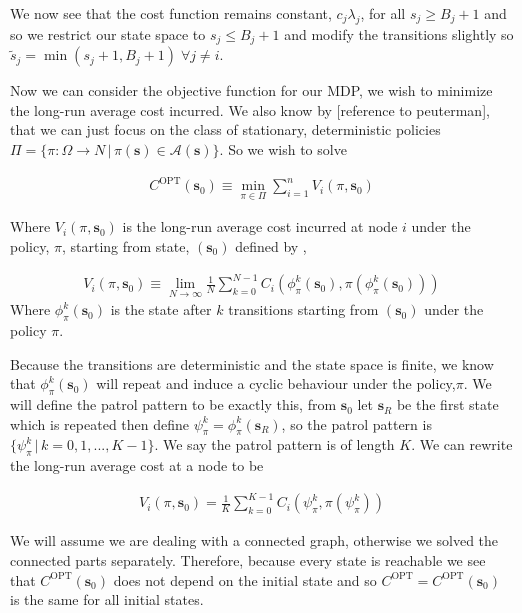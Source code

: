 \documentclass[a4paper,10pt]{article}
\theoremstyle{definition}
\theoremstyle{definition}
\theoremstyle{remark}
\theoremstyle{definition}
\begin{document}
We now see that the cost function remains constant, $c_{j} \lambda_{j}$, for all $s_{j} \geq B_{j}+1$ and so we restrict our state space to $s_{j} \leq B_{j}+1$ and modify the transitions slightly so $\widetilde{s}_{j}=\min(s_{j}+1,B_{j}+1) \; \forall j \neq i$.

Now we can consider the objective function for our MDP, we wish to minimize the long-run average cost incurred. We also know by [reference to peuterman], that we can just focus on the class of stationary, deterministic policies $\Pi= \{\pi: \Omega \rightarrow N \, |\,\pi(\bm{s}) \in \mathcal{A}(\bm{s}) \}$. So we wish to solve

\begin{align*}
C^{\text{OPT}}(\bm{s}_{0}) \equiv \min\limits_{\pi \in \Pi} \sum\limits_{i=1}^{n} V_{i}(\pi,\bm{s}_{0})
\end{align*}

Where $V_{i}(\pi,\bm{s}_{0})$ is the long-run average cost incurred at node $i$ under the policy, $\pi$, starting from state, $(\bm{s}_{0})$ defined by ,

\begin{align*}
V_{i}(\pi,\bm{s}_{0}) \equiv \lim\limits_{N \rightarrow \infty} \frac{1}{N} \sum\limits_{k=0}^{N-1} C_{i}(\phi^{k}_{\pi}(\bm{s}_{0}),\pi(\phi^{k}_{\pi}(\bm{s}_{0})))
\end{align*}
Where $\phi^{k}_{\pi}(\bm{s}_{0})$ is the state after $k$ transitions starting from $(\bm{s}_{0})$ under the policy $\pi$.

Because the transitions are deterministic and the state space is finite, we know that $\phi^{k}_{\pi}(\bm{s}_{0})$ will repeat and induce a cyclic behaviour under the policy,$\pi$. We will define the patrol pattern to be exactly this, from $\bm{s}_{0}$ let $\bm{s}_{R}$ be the first state which is repeated then define $\psi^{k}_{\pi}=\phi^{k}_{\pi}(\bm{s}_{R})$, so the patrol pattern is $\{\psi^{k}_{\pi} \, | \, k=0,1,...,K-1 \}$. We say the patrol pattern is of length $K$. We can rewrite the long-run average cost at a node to be

\begin{align*}
V_{i}(\pi,\bm{s}_{0})=\frac{1}{K} \sum\limits_{k=0}^{K-1} C_{i}(\psi^{k}_{\pi},\pi(\psi^{k}_{\pi}))
\end{align*}

We will assume we are dealing with a connected graph, otherwise we solved the connected parts separately. Therefore, because every state is reachable we see that $C^{\text{OPT}}(\bm{s}_{0})$ does not depend on the initial state and so $C^{\text{OPT}}=C^{\text{OPT}}(\bm{s}_{0})$ is the same for all initial states.
\end{document}
